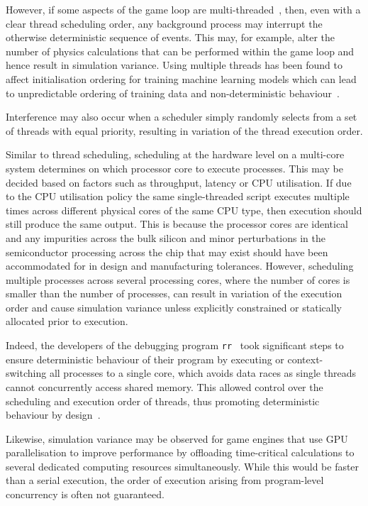 However, if some aspects of the game loop are multi-threaded~\cite{unity_multithreading}, then, even with a clear thread scheduling order, any background process may interrupt the otherwise deterministic sequence of events. This may, for example, alter the number of physics calculations that can be performed within the game loop and hence result in simulation variance.
%
Using multiple threads has been found to affect initialisation ordering for training machine learning models which can lead to unpredictable ordering of training data and non-deterministic behaviour~\cite{Sculley2015,Breck2017}.
%

Interference may also occur when a scheduler simply randomly selects from a set of threads with equal priority, resulting in variation of the thread execution order.

Similar to thread scheduling, scheduling at the hardware level on a multi-core system determines on which processor core to execute processes. This may be decided based on factors such as throughput, latency or CPU utilisation. 
%
If due to the CPU utilisation policy the same single-threaded script executes multiple times across different physical cores of the same CPU type,  then execution should still produce the same output. 
%
This is because the processor cores are identical and any impurities across the bulk silicon and minor perturbations in the semiconductor processing across the chip that may exist should have been accommodated for in design and manufacturing tolerances.
%
However, scheduling multiple processes across several processing cores, where the number of cores is smaller than the number of processes, can result in variation of the execution order and cause simulation variance unless explicitly constrained or statically allocated prior to execution. 

Indeed, the developers of the debugging program \texttt{rr}~\cite{RR_link} took significant steps to ensure deterministic behaviour of their program by executing or context-switching all processes to a single core, which avoids data races as single threads cannot concurrently access shared memory. This allowed control over the scheduling and execution order of threads, thus promoting deterministic behaviour by design~\cite{acm-q-rr-interview}.
%

Likewise, simulation variance may be observed for game engines that use GPU parallelisation to improve performance by offloading time-critical calculations to several dedicated computing resources simultaneously. While this would be faster than a serial execution, the order of execution arising from program-level concurrency is often not guaranteed. 

